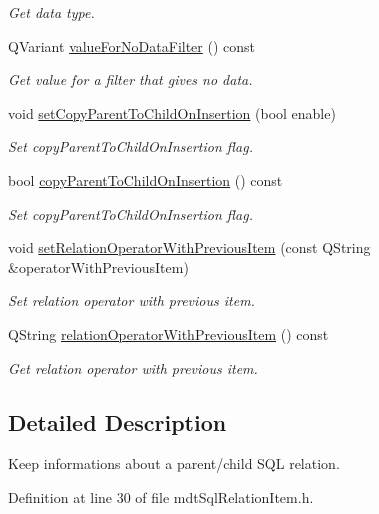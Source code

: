 \begin{DoxyCompactItemize}
\begin{DoxyCompactList}\small\item\em Get data type. \end{DoxyCompactList}\item 
QVariant \hyperlink{classmdt_sql_relation_item_a3d2e24b35c88b246dac2a825019f037b}{valueForNoDataFilter} () const 
\begin{DoxyCompactList}\small\item\em Get value for a filter that gives no data. \end{DoxyCompactList}\item 
void \hyperlink{classmdt_sql_relation_item_aa9826f0e86d7ba7acf046012bbf8a38f}{setCopyParentToChildOnInsertion} (bool enable)
\begin{DoxyCompactList}\small\item\em Set copyParentToChildOnInsertion flag. \end{DoxyCompactList}\item 
bool \hyperlink{classmdt_sql_relation_item_a959affdf96c2d4882028270f9ae7cf00}{copyParentToChildOnInsertion} () const 
\begin{DoxyCompactList}\small\item\em Set copyParentToChildOnInsertion flag. \end{DoxyCompactList}\item 
void \hyperlink{classmdt_sql_relation_item_a00fd905a9b9e7d3f33ac73df0f1e8901}{setRelationOperatorWithPreviousItem} (const QString \&operatorWithPreviousItem)
\begin{DoxyCompactList}\small\item\em Set relation operator with previous item. \end{DoxyCompactList}\item 
QString \hyperlink{classmdt_sql_relation_item_aad30a0f5b83e6efb0c43d87648369c11}{relationOperatorWithPreviousItem} () const 
\begin{DoxyCompactList}\small\item\em Get relation operator with previous item. \end{DoxyCompactList}\end{DoxyCompactItemize}


\subsection{Detailed Description}
Keep informations about a parent/child SQL relation. 

Definition at line 30 of file mdtSqlRelationItem.h.



